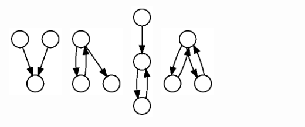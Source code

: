 \begin{table}[t!]
\begin{tabular}{l|lllllllllllll}
    \includegraphics[height=0.03\textheight]{M10-plain} &
    \includegraphics[height=0.03\textheight]{M11-plain} &
    \includegraphics[height=0.03\textheight]{M12-plain} &
    \includegraphics[height=0.03\textheight]{M13-plain} \\

\end{tabular}
\end{table}
